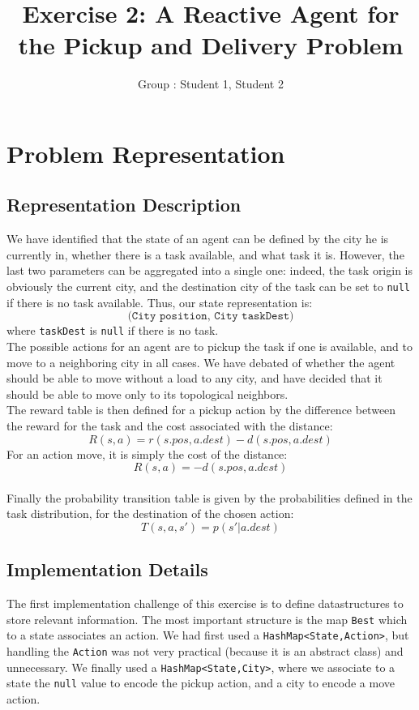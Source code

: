 \documentclass[11pt]{article}
\title{\bf Exercise 2: A Reactive Agent for the Pickup and Delivery Problem}
\author{Group \textnumero: Student 1, Student 2}
\begin{document}
\maketitle

\section{Problem Representation}

\subsection{Representation Description}
We have identified that the state of an agent can be defined by the city he is currently in, whether there is a task available, and what task it is. However, the last two parameters can be aggregated into a single one: indeed, the task origin is obviously the current city, and the destination city of the task can be set to \texttt{null} if there is no task available. Thus, our state representation is:
$$ \texttt{(City position, City taskDest)} $$
where \texttt{taskDest} is \texttt{null} if there is no task.
\\

The possible actions for an agent are to pickup the task if one is available, and to move to a neighboring city in all cases. We have debated of whether the agent should be able to move without a load to any city, and have decided that it should be able to move only to its topological neighbors.
\\

The reward table is then defined for a pickup action by the difference between the reward for the task and the cost associated with the distance:
$$ R(s,a) = r(s.pos, a.dest) - d(s.pos,a.dest) $$
For an action move, it is simply the cost of the distance:
$$ R(s,a) = - d(s.pos,a.dest) $$
~\\

Finally the probability transition table is given by the probabilities defined in the task distribution, for the destination of the chosen action:
$$ T(s,a,s') = p(s' | a.dest) $$

\subsection{Implementation Details}
The first implementation challenge of this exercise is to define datastructures to store relevant information. The most important structure is the map \texttt{Best} which to a state associates an action. We had first used a \texttt{HashMap<State,Action>}, but handling the \texttt{Action} was not very practical (because it is an abstract class) and unnecessary. We finally used a \texttt{HashMap<State,City>}, where we associate to a state the \texttt{null} value to encode the pickup action, and a city to encode a move action.\\
\end{document}
